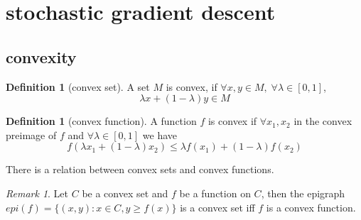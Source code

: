 \documentclass[a4paper, 12pt]{article}
\theoremstyle{plain}
\theoremstyle{definition}
\newtheorem{definition}[theorem]{Definition} %
\theoremstyle{lemma}
\theoremstyle{remark}
\newtheorem{remark}[theorem]{Remark}
\theoremstyle{example}
\begin{document}
	\section{stochastic gradient descent}
	\subsection{convexity}
	\begin{definition}[convex set]
		A set $M$ is convex, if $\forall x,y \in M, \; \forall \lambda \in [0,1]$, $$\lambda x + (1-\lambda) y \in M$$
	\end{definition}
	\begin{definition}[convex function]
		A function $f$ is convex if $\forall x_1, x_2$ in the convex preimage of $f$ and $\forall \lambda \in [0,1]$ we have \[f(\lambda x_1 + (1-\lambda) x_2)\leq\lambda f(x_1) + (1-\lambda) f(x_2)\]
	\end{definition}
	There is a relation between convex sets and convex functions.
	\begin{remark}
		Let $C$ be a convex set and $f$ be a function on $C$, then the epigraph $epi(f) = \{(x,y): x \in C, y \geq f(x)\}$ is a convex set iff $f$ is a convex function. 
	\end{remark}
\end{document}
